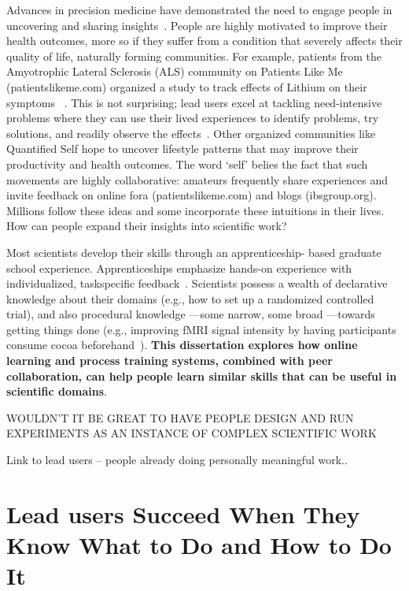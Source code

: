 Advances in precision medicine have demonstrated the need
to engage people in uncovering and sharing insights~\cite{Aronson2015}. People
are highly motivated to improve their health outcomes,
more so if they suffer from a condition that severely affects
their quality of life, naturally forming communities. For example,
patients from the Amyotrophic Lateral Sclerosis
(ALS) community on Patients Like Me (patientslikeme.com)
organized a study to track effects of Lithium on their symptoms
~\cite{Wicks2011}. This is not surprising; lead users excel at tackling
need-intensive problems where they can use their lived
experiences to identify problems, try solutions, and readily
observe the effects~\cite{VonHippel2005}. Other organized communities like
Quantified Self hope to uncover lifestyle patterns that may
improve their productivity and health outcomes. The word
‘self’ belies the fact that such movements are highly collaborative:
amateurs frequently share experiences and invite
feedback on online fora (patientslikeme.com) and blogs
(ibsgroup.org). Millions follow these ideas and some incorporate
these intuitions in their lives. How can people expand
their insights into scientific work?

Most scientists develop their skills through an apprenticeship-
based graduate school experience. Apprenticeships emphasize
hands-on experience with individualized, taskspecific
feedback~\cite{schon1984reflective}. Scientists possess a wealth of declarative
knowledge about their domains (e.g., how to set up a
randomized controlled trial), and also procedural knowledge
—some narrow, some broad —towards getting things done
(e.g., improving fMRI signal intensity by having participants
consume cocoa beforehand~\cite{Francis2006}). \textbf{This dissertation explores how
online learning and process training systems, combined with
peer collaboration, can help people learn similar skills that
can be useful in scientific domains}.

WOULDN'T IT BE GREAT TO HAVE PEOPLE DESIGN AND RUN EXPERIMENTS AS AN INSTANCE OF COMPLEX SCIENTIFIC WORK

Link to lead users -- people already doing personally meaningful work.. 

\section{Lead users Succeed When They Know What to Do and How to Do It}

